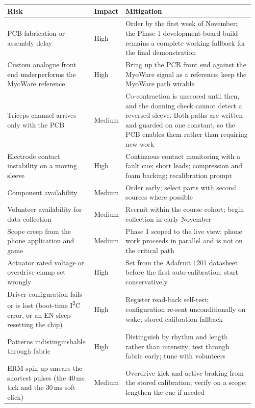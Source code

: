 \documentclass[11pt]{article}
\begin{document}
\begin{table}[H]
\centering\small
\begin{tabularx}{\linewidth}{@{}p{40mm} p{14mm} X@{}}
\toprule
\textbf{Risk} & \textbf{Impact} & \textbf{Mitigation} \\
\midrule
PCB fabrication or assembly delay & High & Order by the first week of November; the Phase 1 development-board build remains a complete working fallback for the final demonstration \\
Custom analogue front end underperforms the MyoWare reference & High & Bring up the PCB front end against the MyoWare signal as a reference; keep the MyoWare path wirable \\
Triceps channel arrives only with the PCB & Medium & Co-contraction is unscored until then, and the donning check cannot detect a reversed sleeve. Both paths are written and guarded on one constant, so the PCB enables them rather than requiring new work \\
Electrode contact instability on a moving sleeve & High & Continuous contact monitoring with a fault cue; short leads; compression and foam backing; recalibration prompt \\
Component availability & Medium & Order early; select parts with second sources where possible \\
Volunteer availability for data collection & Medium & Recruit within the course cohort; begin collection in early November \\
Scope creep from the phone application and game & Medium & Phase 1 scoped to the live view; phone work proceeds in parallel and is not on the critical path \\
Actuator rated voltage or overdrive clamp set wrongly & High & Set from the Adafruit 1201 datasheet before the first auto-calibration; start conservatively \\
Driver configuration fails or is lost (boot-time I\textsuperscript{2}C error, or an EN sleep resetting the chip) & High & Register read-back self-test; configuration re-sent unconditionally on wake; stored-calibration fallback \\
Patterns indistinguishable through fabric & High & Distinguish by rhythm and length rather than intensity; test through fabric early; tune with volunteers \\
ERM spin-up smears the shortest pulses (the 40\,ms tick and the 30\,ms soft click) & Medium & Overdrive kick and active braking from the stored calibration; verify on a scope; lengthen the cue if needed \\

\end{tabularx}
\end{table}
\end{document}
